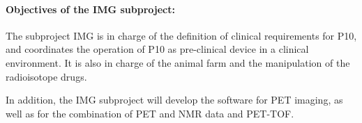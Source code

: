 \paragraph{Objectives of the IMG subproject:}

The subproject IMG is in charge of the definition of clinical requirements for P10, and coordinates the operation of P10 as pre-clinical device in a clinical environment. It is also in charge of the animal farm and the manipulation of the radioisotope drugs. 

In addition, the IMG subproject will develop the software for PET imaging, as well as for the combination of PET and NMR data and PET-TOF.  

